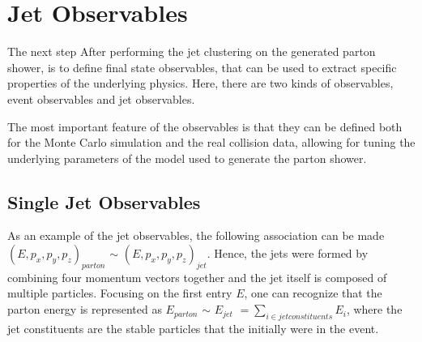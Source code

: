 \chapter{Jet Observables}

The next step After performing the jet clustering on the generated parton shower, is to define final state observables, that can be used to extract specific properties of the underlying physics. Here, there are two kinds of observables, event observables and jet observables.  

The most important feature of the observables is that they can be defined both for the Monte Carlo simulation and the real collision data, allowing for tuning the underlying parameters of the model used to generate the parton shower. 
\section{Single Jet Observables}


As an example of the jet observables, the following association can be made $(E, p_x, p_y, p_z)_{parton}$ $\sim$ $(E, p_x, p_y, p_z)_{jet}$. Hence, the jets were formed by combining four momentum vectors together and the jet itself is composed of multiple particles. Focusing on the first entry $E$, one can recognize that the parton energy is represented as $E_{parton}$ $\sim$ $E_{jet}$  $= \sum_{i \in jet constituents} E_{i}$, where the jet constituents are the stable particles that the initially were in the event. 

